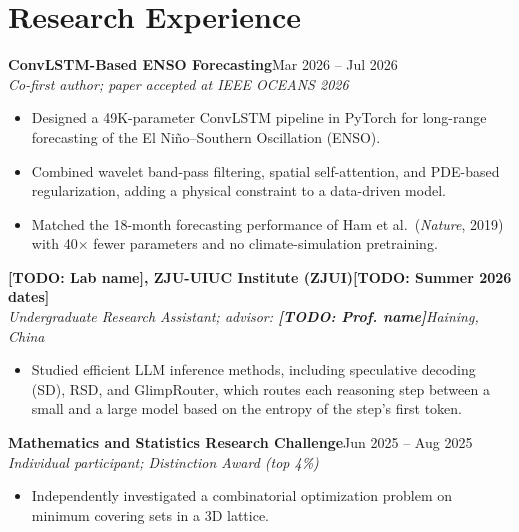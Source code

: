 \documentclass[11pt,letterpaper]{article}
\newcommand{\entry}[4]{%
  \par\vspace{3pt}\noindent
  \textbf{#1}\hfill #2\\
  \textit{#3}\hfill\textit{#4}\par}
\newcommand{\todo}[1]{\textbf{[TODO: #1]}}
\begin{document}
\section*{Research Experience}
\entry{ConvLSTM-Based ENSO Forecasting}{Mar 2026 -- Jul 2026}
      {Co-first author; paper accepted at IEEE OCEANS 2026}{}
\begin{itemize}
  \item Designed a 49K-parameter ConvLSTM pipeline in PyTorch for long-range forecasting of the
        El Ni\~no--Southern Oscillation (ENSO).
  \item Combined wavelet band-pass filtering, spatial self-attention, and PDE-based regularization,
        adding a physical constraint to a data-driven model.
  \item Matched the 18-month forecasting performance of Ham et al.\ (\textit{Nature}, 2019) with
        40$\times$ fewer parameters and no climate-simulation pretraining.
\end{itemize}

\entry{\todo{Lab name}, ZJU-UIUC Institute (ZJUI)}{\todo{Summer 2026 dates}}
      {Undergraduate Research Assistant; advisor: \todo{Prof. name}}{Haining, China}
\begin{itemize}
  \item Studied efficient LLM inference methods, including speculative decoding (SD), RSD, and
        GlimpRouter, which routes each reasoning step between a small and a large model based on
        the entropy of the step's first token.
\end{itemize}

\entry{Mathematics and Statistics Research Challenge}{Jun 2025 -- Aug 2025}
      {Individual participant; Distinction Award (top 4\%)}{}
\begin{itemize}
  \item Independently investigated a combinatorial optimization problem on minimum covering sets
        in a 3D lattice.
\end{itemize}

\end{document}
